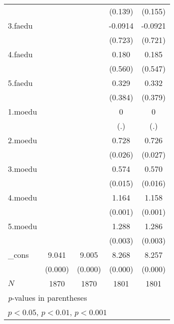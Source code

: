 {\begin{tabular}{l*{4}{c}}
            &                     &                     &     (0.139)         &     (0.155)         \\
[1em]
3.faedu     &                     &                     &     -0.0914         &     -0.0921         \\
            &                     &                     &     (0.723)         &     (0.721)         \\
[1em]
4.faedu     &                     &                     &       0.180         &       0.185         \\
            &                     &                     &     (0.560)         &     (0.547)         \\
[1em]
5.faedu     &                     &                     &       0.329         &       0.332         \\
            &                     &                     &     (0.384)         &     (0.379)         \\
[1em]
1.moedu     &                     &                     &           0         &           0         \\
            &                     &                     &         (.)         &         (.)         \\
[1em]
2.moedu     &                     &                     &       0.728\sym{*}  &       0.726\sym{*}  \\
            &                     &                     &     (0.026)         &     (0.027)         \\
[1em]
3.moedu     &                     &                     &       0.574\sym{*}  &       0.570\sym{*}  \\
            &                     &                     &     (0.015)         &     (0.016)         \\
[1em]
4.moedu     &                     &                     &       1.164\sym{**} &       1.158\sym{**} \\
            &                     &                     &     (0.001)         &     (0.001)         \\
[1em]
5.moedu     &                     &                     &       1.288\sym{**} &       1.286\sym{**} \\
            &                     &                     &     (0.003)         &     (0.003)         \\
[1em]
\_cons      &       9.041\sym{***}&       9.005\sym{***}&       8.268\sym{***}&       8.257\sym{***}\\
            &     (0.000)         &     (0.000)         &     (0.000)         &     (0.000)         \\
\hline
\(N\)       &        1870         &        1870         &        1801         &        1801         \\
\hline\hline
\multicolumn{5}{l}{\footnotesize \textit{p}-values in parentheses}\\
\multicolumn{5}{l}{\footnotesize \sym{*} \(p<0.05\), \sym{**} \(p<0.01\), \sym{***} \(p<0.001\)}\\
\end{tabular}
}
